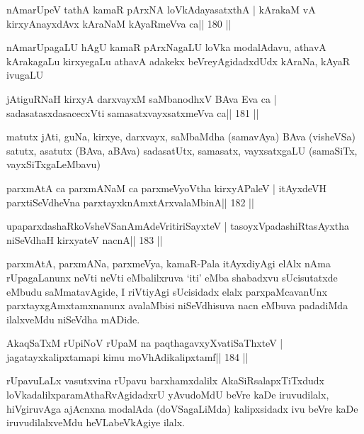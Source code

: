 \begin{shl}
nAmarUpeV tathA kamaR pArxNA loVkAdayasatxthA |
kArakaM vA kirxyA\s nayxdAvx kAraNaM kAyaRmeVva ca\hfill || 180 ||
\end{shl}

\begin{artha}
nAmarUpagaLU hAgU kamaR pArxNagaLU loVka modalAdavu, athavA kArakagaLu
kirxyegaLu athavA adakekx beVreyAgidadxdUdx kAraNa, kAyaR ivugaLU
\end{artha}

\begin{shl}
jAtiguRNaH kirxyA darxvayxM saMbanodhxV BAva Eva ca |
sadasatasxdasacecxVti samasatxvayxsatxmeVva ca\hfill || 181 ||
\end{shl}

\begin{artha}
matutx jAti, guNa, kirxye, darxvayx, saMbaMdha (samavAya) BAva
(visheVSa) satutx, asatutx (BAva, aBAva) sadasatUtx, samasatx,
vayxsatxgaLU (samaSiTx, vayxSiTxgaLeMbavu)
\end{artha}

\begin{shl}
parxmAtA ca parxmANaM ca parxmeVyoV\s tha kirxyAPaleV |
itAyxdeVH parxtiSeVdheVna parxtayxknAmxtArxvalaMbinA\hfill || 182 ||
\end{shl}

\begin{shl}
upaparxdashaRkoV\s sheVSanAmAdeVritiriSayxteV |
tasoyxVpadashiRtasAyxtha niSeVdhaH kirxyateV nacnA\hfill || 183 ||
\end{shl}

\begin{artha}
parxmAtA, parxmANa, parxmeVya, kamaR-Pala itAyxdiyAgi elAlx nAma rUpagaLanunx neVti neVti eMbalilxruva `iti' eMba shabadxvu sUcisutatxde eMbudu saMmatavAgide, I riVtiyAgi sUcisidadx elalx parxpaMcavanUnx parxtayxgAmxtamxnanunx avalaMbisi niSeVdhisuva nacn eMbuva padadiMda ilalxveMdu niSeVdha mADide.
\end{artha}


\begin{shl}
AkaqSaTxM rUpiNoV rUpaM na paqthagavxyXvatiSaThxteV |
jagatayxkalipxtamapi kimu moVhAdikalipxtamf\hfill || 184 ||
\end{shl}

\begin{artha}
rUpavuLaLx vasutxvina rUpavu barxhamxdalilx AkaSiRsalapxTiTxdudx loVkadalilx\break paramAthaRvAgidadxrU yAvudoMdU beVre kaDe iruvudilalx, hiVgiruvAga ajAcnxna modalAda (doVSagaLiMda) kalipxsidadx ivu beVre kaDe iruvudilalxveMdu heVLabeVkAgiye ilalx.
\end{artha}

